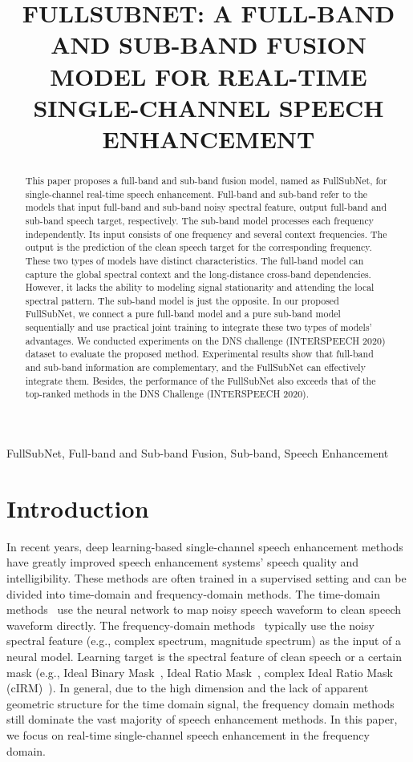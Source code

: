 \documentclass{article}
\title{FULLSUBNET: A FULL-BAND AND SUB-BAND FUSION MODEL FOR REAL-TIME SINGLE-CHANNEL SPEECH ENHANCEMENT}
\begin{document}
\ninept
\maketitle
\begin{abstract}
    This paper proposes a full-band and sub-band fusion model, named as FullSubNet, for single-channel real-time speech enhancement. Full-band and sub-band refer to the models that input full-band and sub-band noisy spectral feature, output full-band and sub-band speech target, respectively. The sub-band model processes each frequency independently. Its input consists of one frequency and several context frequencies. The output is the prediction of the clean speech target for the corresponding frequency. These two types of models have distinct characteristics. The full-band model can capture the global spectral context and the long-distance cross-band dependencies. However, it lacks the ability to modeling signal stationarity and attending the local spectral pattern. The sub-band model is just the opposite. In our proposed FullSubNet, we connect a pure full-band model and a pure sub-band model sequentially and use practical joint training to integrate these two types of models' advantages. We conducted experiments on the DNS challenge (INTERSPEECH 2020) dataset to evaluate the proposed method. Experimental results show that full-band and sub-band information are complementary, and the FullSubNet can effectively integrate them. Besides, the performance of the FullSubNet also exceeds that of the top-ranked methods in the DNS Challenge (INTERSPEECH 2020).
\end{abstract}
\begin{keywords}
    FullSubNet, Full-band and Sub-band Fusion, Sub-band, Speech Enhancement
\end{keywords}
\section{Introduction}
\label{sec:intro}
In recent years, deep learning-based single-channel speech enhancement methods have greatly improved speech enhancement systems' speech quality and intelligibility.
These methods are often trained in a supervised setting and can be divided into time-domain and frequency-domain methods.
The time-domain methods~\cite{rethage2018wavenet, tcnn, Hao2019} use the neural network to map noisy speech waveform to clean speech waveform directly.
The frequency-domain methods~\cite{regression_approch, se_overview, lstm_ss, phase_sensitive_bilstm} typically use the noisy spectral feature (e.g., complex spectrum, magnitude spectrum) as the input of a neural model. Learning target is the spectral feature of clean speech or a certain mask (e.g., Ideal Binary Mask~\cite{ibm_as_goal_wang_2005}, Ideal Ratio Mask~\cite{irm}, complex Ideal Ratio Mask (cIRM)~\cite{cIRM}).
In general, due to the high dimension and the lack of apparent geometric structure for the time domain signal, the frequency domain methods still dominate the vast majority of speech enhancement methods.
In this paper, we focus on real-time single-channel speech enhancement in the frequency domain.
\end{document}
